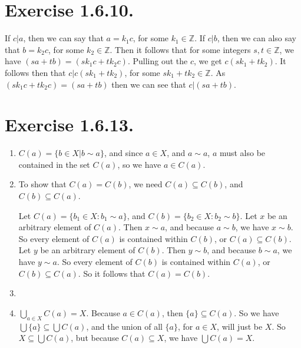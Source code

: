 \documentclass[12pt]{article}
\theoremstyle{definition}
\numberwithin{equation}{subsection}
\begin{document}
\section{Exercise 1.6.10.}
If $c|a$, then we can say that $a=k_1c$, for some $k_1\in\mathbb{Z}$. If $c|b$, then we can also say that $b=k_2c$, for some $k_2\in\mathbb{Z}$. Then it follows that for some integers $s,t\in\mathbb{Z}$, we have $(sa+tb)=(sk_1c+tk_2c)$. Pulling out the $c$, we get $c(sk_1+tk_2)$. It follows then that $c|c(sk_1+tk_2)$, for some $sk_1+tk_2\in\mathbb{Z}$. As $(sk_1c+tk_2c) = (sa+tb)$ then we can see that $c|(sa+tb)$.

\section{Exercise 1.6.13.}
\begin{enumerate}
    \item $C(a) = \{b \in X | b \sim a\}$, and since $a\in X$, and $a\sim a$, $a$ must also be contained in the set $C(a)$, so we have $a\in C(a)$.
    \item 
    
    To show that $C(a)=C(b)$, we need $C(a)\subseteq C(b)$, and $C(b)\subseteq C(a)$.

    Let $C(a)=\{b_1\in X:b_1\sim a\}$, and $C(b)=\{b_2\in X:b_2\sim b\}$. Let $x$ be an arbitrary element of $C(a)$. Then $x\sim a$, and because $a\sim b$, we have $x\sim b$. So every element of $C(a)$ is contained within $C(b)$, or $C(a)\subseteq C(b)$. Let $y$ be an arbitrary element of $C(b)$. Then $y\sim b$, and because $b\sim a$, we have $y\sim a$. So every element of $C(b)$ is contained within $C(a)$, or $C(b)\subseteq C(a)$. So it follows that $C(a)=C(b)$.
        \item 
        \item $\bigcup_{a \in X} C(a) = X$. Because $a\in C(a)$, then $\{a\}\subseteq C(a)$. So we have $\bigcup\{a\}\subseteq\bigcup C(a)$, and the union of all $\{a\}$, for $a\in X$, will just be $X$. So $X\subseteq \bigcup C(a)$, but because $C(a)\subseteq X$, we have $\bigcup C(a)=X$. 


\end{enumerate}
\end{document}
